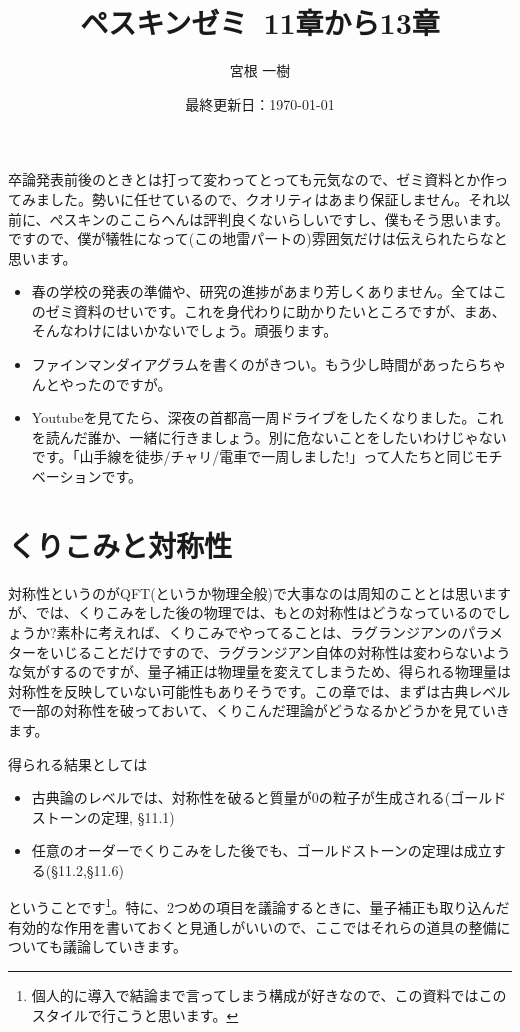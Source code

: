\documentclass[unicode,a4paper,11pt]{ltjsarticle}
\title{ペスキンゼミ\ 11章から13章}
\author{宮根 一樹}
\date{最終更新日：\today}
\theoremstyle{definition}
\begin{document}
\maketitle

\tableofcontents

\vspace*{10pt}

卒論発表前後のときとは打って変わってとっても元気なので、ゼミ資料とか作ってみました。勢いに任せているので、クオリティはあまり保証しません。それ以前に、ぺスキンのここらへんは評判良くないらしいですし、僕もそう思います。ですので、僕が犠牲になって(この地雷パートの)雰囲気だけは伝えられたらなと思います。

\vspace*{10pt}

\begin{itemize}
   \item
         春の学校の発表の準備や、研究の進捗があまり芳しくありません。全てはこのゼミ資料のせいです。これを身代わりに助かりたいところですが、まあ、そんなわけにはいかないでしょう。頑張ります。
   \item
         ファインマンダイアグラムを書くのがきつい。もう少し時間があったらちゃんとやったのですが。
   \item
         Youtubeを見てたら、深夜の首都高一周ドライブをしたくなりました。これを読んだ誰か、一緒に行きましょう。別に危ないことをしたいわけじゃないです。「山手線を徒歩/チャリ/電車で一周しました!」って人たちと同じモチベーションです。
\end{itemize}

\clearpage

\section{くりこみと対称性}

対称性というのがQFT(というか物理全般)で大事なのは周知のこととは思いますが、では、くりこみをした後の物理では、もとの対称性はどうなっているのでしょうか?素朴に考えれば、くりこみでやってることは、ラグランジアンのパラメターをいじることだけですので、ラグランジアン自体の対称性は変わらないような気がするのですが、量子補正は物理量を変えてしまうため、得られる物理量は対称性を反映していない可能性もありそうです。この章では、まずは古典レベルで一部の対称性を破っておいて、くりこんだ理論がどうなるかどうかを見ていきます。

得られる結果としては
\begin{itemize}
   \item
         古典論のレベルでは、対称性を破ると質量が0の粒子が生成される(ゴールドストーンの定理, \S11.1)
   \item
         任意のオーダーでくりこみをした後でも、ゴールドストーンの定理は成立する(\S11.2,\S11.6)
\end{itemize}
ということです\footnote{
   個人的に導入で結論まで言ってしまう構成が好きなので、この資料ではこのスタイルで行こうと思います。
}。特に、2つめの項目を議論するときに、量子補正も取り込んだ有効的な作用を書いておくと見通しがいいので、ここではそれらの道具の整備についても議論していきます。
\end{document}
